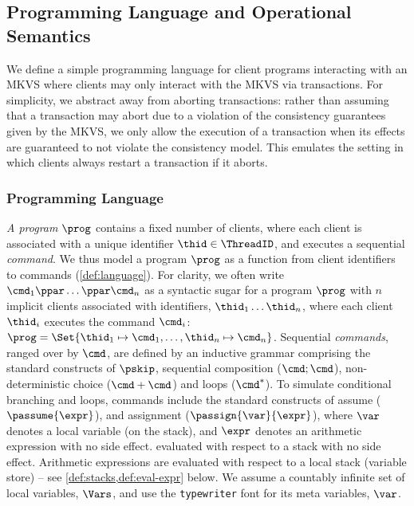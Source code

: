 \subsection{Programming Language and Operational Semantics}

We define a simple programming language for client programs interacting with an MKVS where clients may only interact with the MKVS via transactions. 
For simplicity, we abstract away from aborting transactions: rather than assuming that a transaction may abort due to a violation of the consistency guarantees given by the MKVS, we only allow the execution of a transaction when its effects are guaranteed to not violate the consistency model. This emulates the setting in which clients always restart a transaction if it aborts.
 
\subsubsection{Programming Language}

\emph{A program} \( \prog \) contains a fixed number of clients, where each client is associated with a unique identifier \( \thid \in \ThreadID \), and executes a sequential \emph{command}.
We thus model a program $\prog$ as a function from client identifiers  to commands (\cref{def:language}).
For clarity, we often write \( \cmd_{1}\ppar \dots \ppar \cmd_{n}\) as a syntactic sugar for a program \( \prog \) with $n$ implicit clients associated with identifiers, $\thid_1 \dots \thid_n$, where each client $\thid_i$ executes the command $\cmd_i$:  \( \prog = \Set{\thid_{1} \mapsto \cmd_{1}, \dots, \thid_{n} \mapsto \cmd_{n}  }\).
Sequential \emph{commands}, ranged over by $\cmd$, are defined by an inductive grammar comprising the standard constructs of $\pskip$, sequential composition ($\cmd; \cmd$), non-deterministic choice ($\cmd+\cmd$) and loops ($\cmd^*$).
To simulate conditional branching and loops, commands include the standard constructs of assume (\( \passume{\expr}\)), and assignment (\( \passign{\var}{\expr} \)), where \( \var \) denotes a local variable (on the stack), and \( \expr \) denotes an arithmetic expression with no side effect.  
evaluated with respect to a stack  with no side effect.
Arithmetic expressions are evaluated with respect to a local stack (variable store) -- see  \cref{def:stacks,def:eval-expr} below.
We assume a countably infinite set of local variables, $\Vars $, and use the \texttt{typewriter} font for its meta variables, \eg $\var$. 

